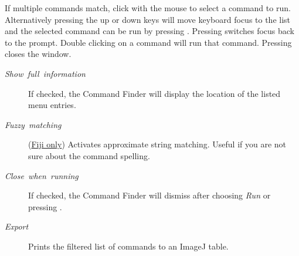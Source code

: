 If multiple commands match, click with the mouse to select a command
to run. Alternatively pressing the up or down keys will move keyboard
focus to the list and the selected command can be run by pressing
. Pressing  switches focus
back to the prompt. Double clicking on a command will run that command.
Pressing  closes the window.
\begin{description}
\item [{\emph{Show\ full\ information}}] If checked, the Command Finder
will display the location of the listed menu entries.
\item [{\emph{Fuzzy\ matching}}] (\href{http://fiji.sc/wiki/index.php/Using_the_Command_Launcher}{Fiji only})
Activates approximate string matching. Useful if you are not sure
about the command spelling.
\item [{\emph{Close\ when\ running}}] If checked, the Command Finder
will dismiss after choosing \emph{Run} or pressing . 
\item [{\emph{Export}}] Prints the filtered list of commands to an ImageJ
table.
\end{description}



\subsubsection[\protect\userinterface{Search\ldots{}}]{\protect{}\label{sub:Search...}}

